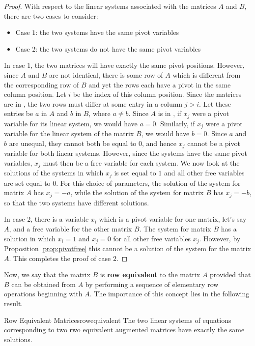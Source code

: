 \begin{proof}
With respect to the linear systems associated with the matrices $A$ and $B$, there are two cases to consider:
\begin{itemize}
\item Case $1$: the two systems have the same pivot variables
\item Case $2$: the two systems do not have the same pivot variables
\end{itemize}
In case $1$, the two matrices will have exactly the same pivot positions. However, since $A$ and $B$ are not identical, there is some row of $A$ which is different from the corresponding row of $B$ and yet the rows each have a pivot in the same column position. Let $i$ be the index of this column position. Since the matrices are in {\rref}, the two rows must differ at some entry in a column $j>i$. Let these entries be $a$ in $A$ and $b$ in $B$, where $a \neq b$. Since $A$ is in {\rref}, if $x_j$ were a pivot variable for its linear system, we would have $a=0$. Similarly, if $x_j$ were a pivot variable for the linear system of the matrix $B$, we would have $b=0$. Since $a$ and $b$ are unequal, they cannot both be equal to $0$, and hence $x_j$ cannot be a pivot variable for both linear systems. However, since the systems have the same pivot variables, $x_j$ must then be a free variable for each system. We now look at the solutions of the systems in which $x_j$ is set equal to $1$ and all other free variables are set equal to $0$. For this choice of parameters, the solution of the system for matrix $A$ has $x_j=-a$, while the solution of the system for matrix $B$ has $x_j=-b$, so that the two systems have different solutions.

In case $2$, there is a variable $x_i$ which is a pivot variable for one matrix, let's say $A$, and a free variable for the other matrix $B$. The system for matrix $B$ has a solution in which $x_i=1$ and $x_j=0$ for all other free variables $x_j$. However, by Proposition \ref{prop:pivotfree} this cannot be a solution of the system for the matrix $A$. This completes the proof of case $2$.
\end{proof}

Now, we say that the matrix $B$ is \textbf{row equivalent} to the matrix $A$ provided that $B$ can be obtained from $A$ by performing a sequence of elementary row operations beginning with $A$. The importance of this concept lies in the following result.

\begin{theorem}{Row Equivalent Matrices}{rowequivalent}
The two linear systems of equations corresponding to two rwo equivalent augmented matrices have exactly the same solutions.
\end{theorem}

